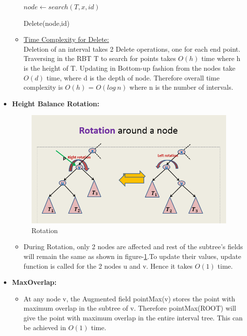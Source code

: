 \documentclass[pdftex,a4paper,12pt]{report}
\begin{document}
\begin{itemize}
\begin{itemize}
\begin{algorithm}
$node \gets search(T,x,id)$\;
\caption{Delete(node,id)}
\end{algorithm}

  \item \underline{Time Complexity for Delete:}	\\
  Deletion of an interval takes 2 Delete operations, one for each end point. Traversing in the RBT T 
  to search for points takes $O(h)$ time where h is the height of T. Updating in Bottom-up fashion from the nodes take $O(d)$ 
  time, where d is the depth of node. Therefore overall time complexity is $O(h)$ = $O(log\ n)$ where n is the number of intervals. 
\end{itemize}

\item \textbf{Height Balance Rotation:}

\begin{figure}[h]
\centering
\includegraphics[scale=0.5]{fig1.png}
\caption{Rotation}
\label{fig1}
\end{figure}
\begin{itemize}
\item During Rotation, only 2 nodes are affected and rest of the subtree's fields will remain the same as shown in figure-\ref{fig1}.To update their values, update function is called for the 2 nodes u and v. Hence it takes $O(1)$ time.
\end{itemize}
\item \textbf{MaxOverlap:}	
\begin{itemize}
\item At any node v, the Augmented field pointMax(v) stores the point with maximum overlap in the subtree of v. Therefore pointMax(ROOT) will give the point with maximum overlap in the entire interval tree.
This can be achieved in $O(1)$ time.
\end{itemize}

\end{itemize}
\end{document}
